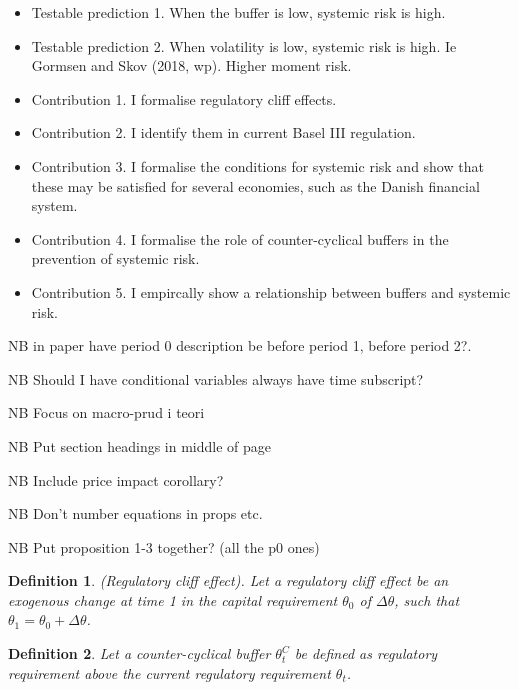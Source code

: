 \documentclass[11pt]{article}
\newtheorem{definition}{Definition}%
\begin{document}
\begin{itemize}
\item Testable prediction 1. When the buffer is low, systemic risk is high.

\item Testable prediction 2. When volatility is low, systemic risk is high. Ie Gormsen and Skov (2018, wp). Higher moment risk.

\item Contribution 1. I formalise regulatory cliff effects.

\item Contribution 2. I identify them in current Basel III regulation. 

\item Contribution 3. I formalise the conditions for systemic risk and show that these may be satisfied for several economies, such as the Danish financial system.

\item Contribution 4. I formalise the role of counter-cyclical buffers in the prevention of systemic risk. 

\item Contribution 5. I empircally show a relationship between buffers and systemic risk.

\end{itemize}

NB in paper have period 0 description be before period 1, before period 2?.

NB Should I have conditional variables always have time subscript?

NB Focus on macro-prud i teori

NB Put section headings in middle of page

NB Include price impact corollary?

NB Don't number equations in props etc.

NB Put proposition 1-3 together? (all the p0 ones)

\newpage
\begin{definition} (Regulatory cliff effect).
Let a regulatory cliff effect be an exogenous change at time 1 in the capital requirement $\theta_0$ of $\Delta \theta$, such that $\theta_1 = \theta_0 + \Delta \theta$. 
\end{definition}

\begin{definition}
Let a counter-cyclical buffer $\theta^C_t$ be defined as regulatory requirement above the current regulatory requirement $\theta_t$.
\end{definition}
\end{document}

